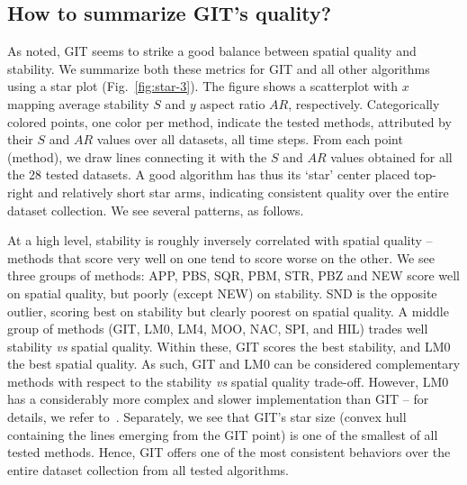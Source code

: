 \subsection{How to summarize GIT's quality?}
%
As noted, GIT seems to strike a good balance between spatial quality and stability. We summarize both these metrics for GIT and all other algorithms using a star plot (Fig.~\ref{fig:star-3}). The figure shows a scatterplot with $x$ mapping average stability $S$ and $y$ aspect ratio $AR$, respectively. Categorically colored points, one color per method, indicate the tested methods, attributed by their $S$ and $AR$ values over all datasets, all time steps. From each point (method), we draw lines connecting it with the $S$ and $AR$ values obtained for all the 28 tested datasets. A good algorithm has thus its `star' center placed top-right and relatively short star arms, indicating consistent quality over the entire dataset collection. We see several patterns, as follows.

At a high level, stability is roughly inversely correlated with spatial quality -- methods that score very well on one tend to score worse on the other. We see three groups of methods: APP, PBS, SQR, PBM, STR, PBZ and NEW score well on spatial quality, but poorly (except NEW) on stability. SND is the opposite outlier, scoring best on stability but clearly poorest on spatial quality. A middle group of methods (GIT, LM0, LM4, MOO, NAC, SPI, and HIL) trades well stability \emph{vs} spatial quality. Within these, GIT scores the best stability, and LM0 the best spatial quality. As such, GIT and LM0 can be considered complementary methods with respect to the stability \emph{vs} spatial quality trade-off. However, LM0 has a considerably more complex and slower implementation than GIT -- for details, we refer to~\cite{sondag17}. Separately, we see that GIT's star size (convex hull containing the lines emerging from the GIT point) is one of the smallest of all tested methods. Hence, GIT offers one of the most consistent behaviors over the entire dataset collection from all tested algorithms.

